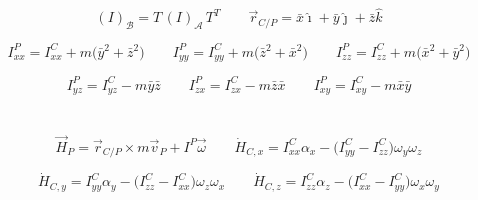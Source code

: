\documentclass{article}
\begin{document}
\section*{}
\[
(I)_\mathcal B=T\,(I)_\mathcal A\,T^T \qquad
\vec r_{C/P}=\bar x\hat\imath+\bar y\hat\jmath+\bar z\hat k
\]

\[
I_{xx}^P=I_{xx}^C+m\bigl(\bar y^2+\bar z^2\bigr) \qquad
I_{yy}^P=I_{yy}^C+m\bigl(\bar z^2+\bar x^2\bigr) \qquad
I_{zz}^P=I_{zz}^C+m\bigl(\bar x^2+\bar y^2\bigr)
\]

\[
I_{yz}^P=I_{yz}^C-m\bar y\bar z \qquad
I_{zx}^P=I_{zx}^C-m\bar z\bar x \qquad
I_{xy}^P=I_{xy}^C-m\bar x\bar y
\]

\section*{}
\[
\vec H_P=\vec r_{C/P}\times m\vec v_P+I^P\vec\omega \qquad
\dot H_{C,x}=I_{xx}^C\alpha_x-\bigl(I_{yy}^C-I_{zz}^C\bigr)\omega_y\omega_z
\]

\[
\dot H_{C,y}=I_{yy}^C\alpha_y-\bigl(I_{zz}^C-I_{xx}^C\bigr)\omega_z\omega_x \qquad
\dot H_{C,z}=I_{zz}^C\alpha_z-\bigl(I_{xx}^C-I_{yy}^C\bigr)\omega_x\omega_y
\]
\end{document}

